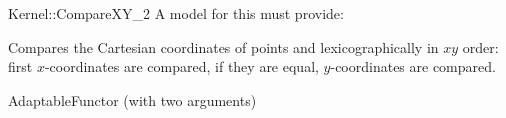 \begin{ccRefFunctionObjectConcept}{Kernel::CompareXY_2}
A model for this must provide:


      {Compares the Cartesian coordinates of points  and
        lexicographically in $xy$ order: first 
       $x$-coordinates are compared, if they are equal, $y$-coordinates
       are compared.}

\ccRefines
AdaptableFunctor (with two arguments)

\ccSeeAlso
{} \\

\end{ccRefFunctionObjectConcept}

